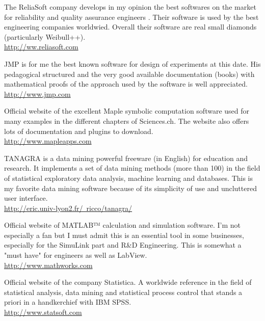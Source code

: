 	{\Large {}}{\Large {}}{\Large {}}{\Large {}} The ReliaSoft company develops in my opinion the best softwares on the market for reliability and quality assurance engineers . Their software is used by the best engineering companies worldwied. Overall their software are real small diamonds (particularly Weibull++).\\
	\href{http://ww.reliasoft.com}{\color{blue}http://ww.reliasoft.com}
	
	{\Large {}}{\Large {}}{\Large {}} JMP is for me the best known software for design of experiments at this date. His pedagogical structured and the very good available documentation (books) with mathematical proofs of the approach used by the software is well appreciated.\\
	\href{http://www.jmp.com}{\color{blue}http://www.jmp.com}
	
	{\Large {}}{\Large {}}{\Large {}}{\Large {}} Official website of the excellent Maple symbolic computation software used for many examples in the different chapters of Sciences.ch. The website also offers lots of documentation and plugins to download.\\
	\href{http://www.mapleapps.com}{\color{blue}http://www.mapleapps.com}
	
	{\Large {}}{\Large {}}{\Large {}}{\Large {}}\bcdfrance{} TANAGRA is a data mining powerful freeware (in English) for education and research. It implements a set of data mining methods (more than 100) in the field of statistical exploratory data analysis, machine learning and databases. This is my favorite  data mining software because of its simplicity of use and uncluttered user interface.\\
	\href{http://eric.univ-lyon2.fr/~ricco/tanagra/}{\color{blue}http://eric.univ-lyon2.fr/~ricco/tanagra/}
	
	{\Large {}}{\Large {}}{\Large {}} Official website of MATLAB™ calculation and simulation software. I'm not especially a fan but I must admit this is an essential tool in some businesses, especially for the SimuLink part and R\&D Engineering. This is somewhat a "must have" for engineers as well as LabView.\\
	\href{http://www.mathworks.com}{\color{blue}http://www.mathworks.com}
	
	\pagebreak
	{\Large {}}{\Large {}}{\Large {}}Official website of the company Statistica. A worldwide reference in the field of statistical analysis, data mining and statistical process control that stands a priori in a handkerchief with IBM SPSS.\\
	\href{http://www.statsoft.com}{\color{blue}http://www.statsoft.com}
	
